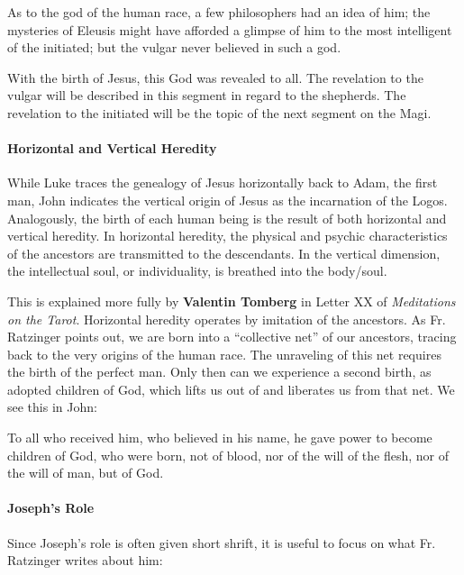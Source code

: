 \begin{quotex}
As to the god of the human race, a few philosophers had an idea of him; the mysteries of Eleusis might have afforded a glimpse of him to the most intelligent of the initiated; but the vulgar never believed in such a god.  

\end{quotex}
With the birth of Jesus, this God was revealed to all. The revelation to the vulgar will be described in this segment in regard to the shepherds. The revelation to the initiated will be the topic of the next segment on the Magi.

\paragraph{Horizontal and Vertical Heredity}
While Luke traces the genealogy of Jesus horizontally back to Adam, the first man, John indicates the vertical origin of Jesus as the incarnation of the Logos. Analogously, the birth of each human being is the result of both horizontal and vertical heredity. In horizontal heredity, the physical and psychic characteristics of the ancestors are transmitted to the descendants. In the vertical dimension, the intellectual soul, or individuality, is breathed into the body/soul.

This is explained more fully by \textbf{Valentin Tomberg} in Letter XX of \emph{Meditations on the Tarot}. Horizontal heredity operates by imitation of the ancestors. As Fr. Ratzinger points out, we are born into a “collective net” of our ancestors, tracing back to the very origins of the human race. The unraveling of this net requires the birth of the perfect man. Only then can we experience a second birth, as adopted children of God, which lifts us out of and liberates us from that net. We see this in John:

\begin{quotex}
To all who received him, who believed in his name, he gave power to become children of God, who were born, not of blood, nor of the will of the flesh, nor of the will of man, but of God. 
\end{quotex}

\paragraph{Joseph's Role}
Since Joseph's role is often given short shrift, it is useful to focus on what Fr. Ratzinger writes about him:

